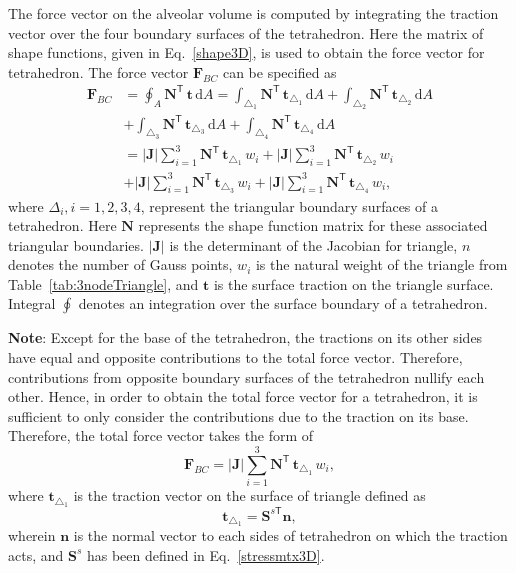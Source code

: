 The force vector on the alveolar volume is computed by integrating the traction vector over the four boundary surfaces of the tetrahedron. Here the matrix of shape functions, given in Eq.~\ref{shape3D}, is used to obtain the force vector for tetrahedron. The force vector $\mathbf{F}_{BC}$ can be specified as
\begin{equation}
\begin{aligned}
\mathbf{F}_{BC} &= \oint_{A} \mathbf{N}^{\mathsf{T}} \, \mathbf{t} \, \mathrm{d} A = \int_{\triangle_{1}} \mathbf{N}^{\mathsf{T}} \, \mathbf{t}_{\triangle_{1}} \, \mathrm{d} A  + \int_{\triangle_{2}}  \mathbf{N}^{\mathsf{T}} \, \mathbf{t}_{\triangle_{2}}  \, \mathrm{d} A \\
& + \int_{\triangle_{3}} \mathbf{N}^{\mathsf{T}} \, \mathbf{t}_{\triangle_{3}} \, \mathrm{d} A + \int_{\triangle_{4}} \mathbf{N}^{\mathsf{T}} \, \mathbf{t}_{\triangle_{4}} \, \mathrm{d} A \\
& = |\mathbf{J}| \sum_{i=1}^{3} \mathbf{N}^{\mathsf{T}} \, \mathbf{t}_{\triangle_{1}} \, w_i  + |\mathbf{J}| \sum_{i=1}^{3}  \mathbf{N}^{\mathsf{T}} \, \mathbf{t}_{\triangle_{2}} \, w_i  \\
& + |\mathbf{J}| \sum_{i=1}^{3} \mathbf{N}^{\mathsf{T}} \, \mathbf{t}_{\triangle_{3}} \, w_i  + |\mathbf{J}| \sum_{i=1}^{3}  \mathbf{N}^{\mathsf{T}} \, \mathbf{t}_{\triangle_{4}} \, w_i ,
\end{aligned}
\end{equation}
where $\Delta_i, i=1, 2, 3, 4$, represent the triangular boundary surfaces of a tetrahedron.  Here $ \mathbf{N}$ represents the shape function matrix for these associated triangular boundaries.   $|\mathbf{J}|$ is the determinant of the Jacobian for triangle, $n$ denotes the number of Gauss points, $w_i$ is the natural weight of the triangle from Table~\ref{tab:3nodeTriangle}, and $\mathbf{t}$ is the surface traction on the triangle surface.  Integral $\oint$ denotes an integration over the surface boundary of a tetrahedron.

\textbf{Note}:  Except for the base of the tetrahedron, the tractions on its other sides have equal and opposite contributions to the total force vector. Therefore, contributions from opposite boundary surfaces of the tetrahedron nullify each other. Hence, in order to obtain the total force vector for a tetrahedron, it is sufficient to only consider the contributions due to the traction on its base. Therefore, the total force vector takes the form of
\begin{equation}
\mathbf{F}_{BC} = |\mathbf{J}| \sum_{i=1}^{3} \mathbf{N}^{\mathsf{T}} \, \mathbf{t}_{\triangle_{1}} \, w_i ,
\end{equation}
where $\mathbf{t}_{\triangle_{1}}$ is the traction vector on the surface of triangle defined as
\begin{equation}
	\mathbf{t}_{\triangle_{1}} = \mathbf{S}^{s\mathsf{T}} \mathbf{n} ,
\end{equation}
wherein $ \mathbf{n} $ is the normal vector to each sides of tetrahedron on which the traction acts, and $ \mathbf{S}^s $ has been defined in Eq.~\ref{stressmtx3D}.


